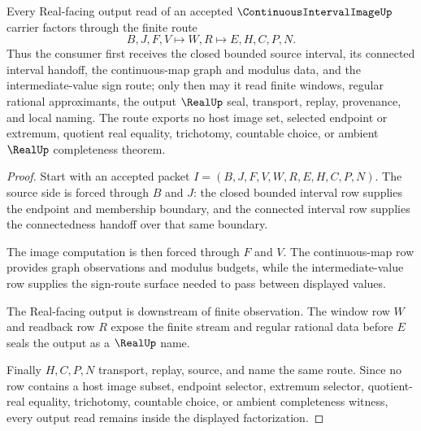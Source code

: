 \begin{theorem}
\label{thm:continuous-interval-image-real-seal-route}
Every Real-facing output read of an accepted $\ContinuousIntervalImageUp$ carrier factors through the finite route
$$
B,J,F,V \longmapsto W,R \longmapsto E,H,C,P,N .
$$
Thus the consumer first receives the closed bounded source interval, its connected interval handoff, the continuous-map graph and modulus data, and the intermediate-value sign route; only then may it read finite windows, regular rational approximants, the output $\RealUp$ seal, transport, replay, provenance, and local naming. The route exports no host image set, selected endpoint or extremum, quotient real equality, trichotomy, countable choice, or ambient $\RealUp$ completeness theorem.
\end{theorem}
\begin{proof}
Start with an accepted packet $I=(B,J,F,V,W,R,E,H,C,P,N)$. The source side is forced through $B$ and $J$: the closed bounded interval row supplies the endpoint and membership boundary, and the connected interval row supplies the connectedness handoff over that same boundary.

The image computation is then forced through $F$ and $V$. The continuous-map row provides graph observations and modulus budgets, while the intermediate-value row supplies the sign-route surface needed to pass between displayed values.

The Real-facing output is downstream of finite observation. The window row $W$ and readback row $R$ expose the finite stream and regular rational data before $E$ seals the output as a $\RealUp$ name.

Finally $H,C,P,N$ transport, replay, source, and name the same route. Since no row contains a host image subset, endpoint selector, extremum selector, quotient-real equality, trichotomy, countable choice, or ambient completeness witness, every output read remains inside the displayed factorization.
\end{proof}

